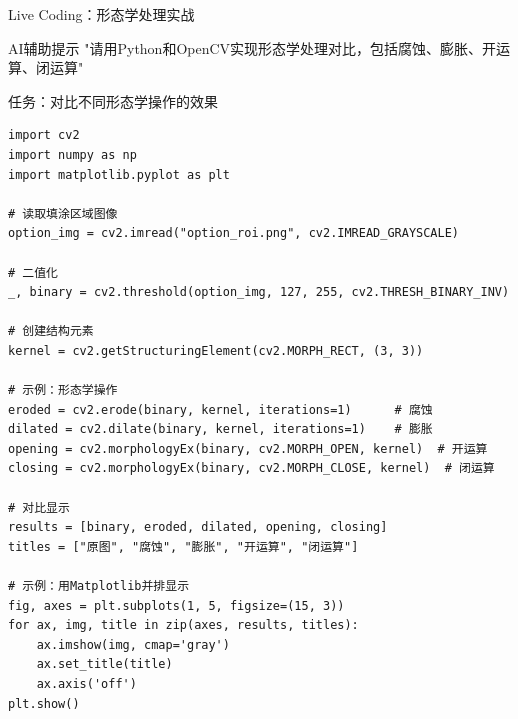 \begin{frame}[fragile]{Live Coding：形态学处理实战}
    \begin{block}{AI辅助提示}
        \aihint{} "请用Python和OpenCV实现形态学处理对比，包括腐蚀、膨胀、开运算、闭运算"
    \end{block}

    \begin{block}{任务：对比不同形态学操作的效果}
    \begin{lstlisting}[basicstyle=\ttfamily\scriptsize]
import cv2
import numpy as np
import matplotlib.pyplot as plt

# 读取填涂区域图像
option_img = cv2.imread("option_roi.png", cv2.IMREAD_GRAYSCALE)

# 二值化
_, binary = cv2.threshold(option_img, 127, 255, cv2.THRESH_BINARY_INV)

# 创建结构元素
kernel = cv2.getStructuringElement(cv2.MORPH_RECT, (3, 3))

# 示例：形态学操作
eroded = cv2.erode(binary, kernel, iterations=1)      # 腐蚀
dilated = cv2.dilate(binary, kernel, iterations=1)    # 膨胀
opening = cv2.morphologyEx(binary, cv2.MORPH_OPEN, kernel)  # 开运算
closing = cv2.morphologyEx(binary, cv2.MORPH_CLOSE, kernel)  # 闭运算

# 对比显示
results = [binary, eroded, dilated, opening, closing]
titles = ["原图", "腐蚀", "膨胀", "开运算", "闭运算"]

# 示例：用Matplotlib并排显示
fig, axes = plt.subplots(1, 5, figsize=(15, 3))
for ax, img, title in zip(axes, results, titles):
    ax.imshow(img, cmap='gray')
    ax.set_title(title)
    ax.axis('off')
plt.show()
    \end{lstlisting}
    \end{block}
\end{frame}

